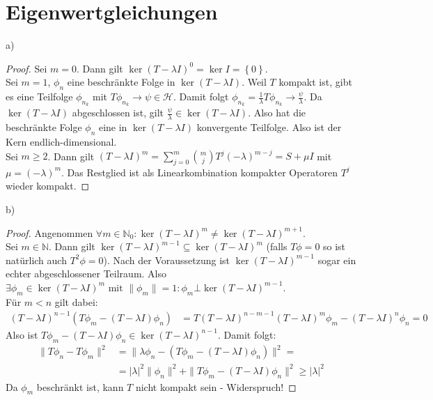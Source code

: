 \documentclass[a4paper,12pt]{article}
\newcommand{\kla}{}
\newcommand{\klammer}{}
\newcommand{\tecxt}{}
\begin{document}
\section{Eigenwertgleichungen}
a)   
\begin{proof}
Sei $m=0$. Dann gilt $\ker\kla\left( {T-\lambda I} \right)^0=\ker I=\klammer\left\{ {0} \right\}$. \\
Sei $m=1$, $\phi_n$ eine beschränkte Folge in $\ker\kla\left( {T-\lambda I} \right)$. Weil $T$ kompakt ist, gibt es eine Teilfolge $\phi_{n_k}$ mit $T\phi_{n_k}\rightarrow\psi\in\mathcal{H}$. Damit folgt $\phi_{n_k}=\frac{1}{\lambda}T\phi_{n_k}\rightarrow\frac{\psi}{\lambda}$. Da $\ker\kla\left( {T-\lambda I} \right)$ abgeschlossen ist, gilt $\frac{\psi}{\lambda}\in\ker\kla\left( {T-\lambda I} \right)$. Also hat die beschränkte Folge $\phi_n$ eine in $\ker\kla\left( {T-\lambda I} \right)$ konvergente Teilfolge. Also ist der Kern endlich-dimensional.\\
Sei $m\ge 2$. Dann gilt $\kla\left( {T-\lambda I} \right)^m=\sum_{j=0}^m\binom{m}{j}T^j(-\lambda)^{m-j}=S+\mu I$ mit $\mu =(-\lambda)^m$. Das Restglied ist als Linearkombination kompakter Operatoren $T^j$ wieder kompakt.
\end{proof}
b)
\begin{proof}
Angenommen $\forall m\in\mathbb{N}_0:\ker\kla\left( {T-\lambda I} \right)^{m}\neq\ker\kla\left( {T-\lambda I} \right)^{m+1}$. \\
Sei $m\in\mathbb{N}$. Dann gilt $\ker\kla\left( {T-\lambda I} \right)^{m-1}\subseteq\ker\kla\left( {T-\lambda I} \right)^{m}$ (falls $T\phi=0$ so ist natürlich auch $T^2\phi=0$). Nach der Voraussetzung ist $\ker\kla\left( {T-\lambda I} \right)^{m-1}$ sogar ein echter abgeschlossener Teilraum. Also $\exists\phi_m\in\ker\kla\left( {T-\lambda I} \right)^{m}\tecxt\text{ mit }\|\phi_m\|=1:\phi_m\bot\ker\kla\left( {T-\lambda I} \right)^{m-1}$. \\
Für $m<n$ gilt dabei:
\begin{align*}
(T-\lambda I)^{n-1}(T\phi_m-(T-\lambda I)\phi_n)&=T(T-\lambda I)^{n-m-1}(T-\lambda I)^m\phi_m-(T-\lambda I)^n\phi_n=0
\end{align*}
Also ist $T\phi_m-(T-\lambda I)\phi_n\in\ker\kla\left( {T-\lambda I} \right)^{n-1}$. Damit folgt:
\begin{align*}
\|T\phi_n-T\phi_m\|^2&=\|\lambda\phi_n-(T\phi_m-(T-\lambda I)\phi_n)\|^2=\\
&=|\lambda|^2\|\phi_n\|^2+\|T\phi_m-(T-\lambda I)\phi_n\|^2\ge|\lambda|^2
\end{align*}
Da $\phi_m$ beschränkt ist, kann $T$ nicht kompakt sein - Widerspruch!
\end{proof}
\end{document}

